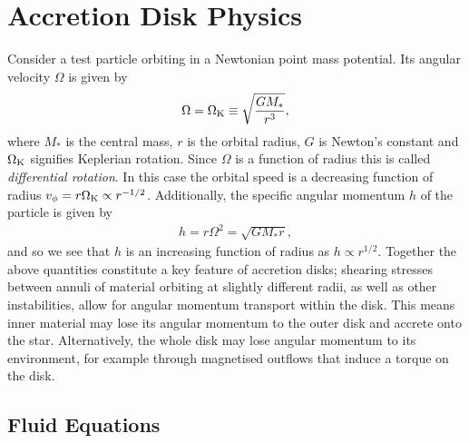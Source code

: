 \section{Accretion Disk Physics}


Consider a test particle orbiting in a Newtonian point mass potential. Its angular velocity $\Omega$ is given by
\begin{align}
    \Omega = \Omega_{\rm K} \equiv \sqrt{\frac{G M_*}{r^3}}, \label{eq:point_pot}
\end{align}
where $M_*$ is the central mass, $r$ is the orbital radius, $G$ is Newton's constant and $\Omega_{\rm K}$ signifies Keplerian rotation. 
Since $\Omega$ is a function of radius this is called \textit{differential rotation}.
In this case the orbital speed is a decreasing function of radius $v_\phi = r \Omega_{\rm K} \propto r^{-1/2}$.
Additionally, the specific angular momentum $h$ of the particle is given by
\begin{align}
    h = r \Omega^2 = \sqrt{G M_* r}, \label{eq:ang_mom}
\end{align}
and so we see that $h$ is an increasing function of radius as $h \propto r^{1/2}$.
Together the above quantities constitute a key feature of accretion disks; shearing stresses between annuli of material orbiting at slightly different radii, as well as other instabilities, allow for angular momentum transport within the disk. 
This means inner material may lose its angular momentum to the outer disk and accrete onto the star. 
Alternatively, the whole disk may lose angular momentum to its environment, for example through magnetised outflows that induce a torque on the disk.

\subsection{Fluid Equations} \label{sec:fluid_eqns}

